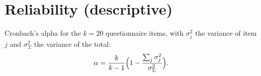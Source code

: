\documentclass[11pt]{article}
\begin{document}
\section{Reliability (descriptive)}

Cronbach's alpha for the $k = 20$ questionnaire items, with $\sigma_j^2$ the variance of item $j$
and $\sigma_{\Sigma}^2$ the variance of the total:
\begin{equation}
  \alpha = \frac{k}{k-1} \Bigl( 1 - \frac{\sum_{j} \sigma_j^2}{\sigma_{\Sigma}^2} \Bigr).
\end{equation}
\end{document}
